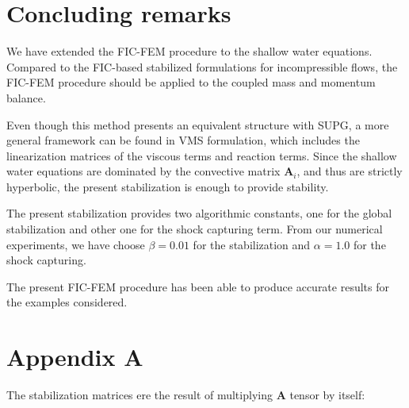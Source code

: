 \documentclass[a4paper,12pt]{article}
\newcommand\Miguel[1]{\ifthenelse{\boolean{show_comments}}{\textcolor{red}{#1}}{}}
\begin{document}
\section{Concluding remarks} \label{sec:conclusions}

We have extended the FIC-FEM procedure to the shallow water equations. Compared to the FIC-based stabilized formulations for incompressible flows, the FIC-FEM procedure should be applied to the coupled mass and momentum balance. \Miguel{NO SE SI S'ENTÉN AIXÒ: QUE NO ES POT ESTABILITZAR EL MOMENT PER UNA BANDA I LA MASSA PER L'ALTRA BANDA}

Even though this method presents an equivalent structure with SUPG, a more general framework can be found in VMS formulation, which includes the linearization matrices of the viscous terms and reaction terms. Since the shallow water equations are dominated by the convective matrix $\mathbf{A}_i$, and thus are strictly hyperbolic, the present stabilization is enough to provide stability.

The present stabilization provides two algorithmic constants, one for the global stabilization and other one for the shock capturing term. From our numerical experiments, we have choose $\beta=0.01$ for the stabilization and $\alpha=1.0$ for the shock capturing.

The present FIC-FEM procedure has been able to produce accurate results for the examples considered.


\section*{Appendix A}

The stabilization matrices ere the result of multiplying $\mathbf{A}$ tensor by itself:
\end{document}

